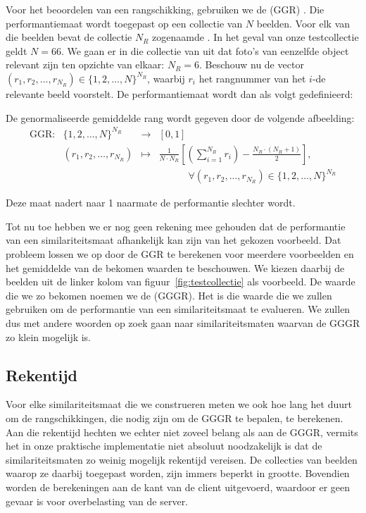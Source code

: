 Voor het beoordelen van een rangschikking, gebruiken we de  
(GGR) \cite{muller:perf_eval}. Die performantiemaat wordt toegepast op een collectie
van $N$ beelden. Voor elk van die beelden bevat de collectie
$N_R$ zogenaamde . In het geval van onze testcollectie geldt $N = 66$.
We gaan er in die collectie van uit dat foto's van eenzelfde object relevant zijn ten opzichte
van elkaar: $N_R = 6$. Beschouw nu de vector 
$(r_1,r_2,\ldots,r_{N_R}) \in \{1,2,\ldots,N\}^{N_R}$, waarbij $r_i$ het
rangnummer van het $i$-de relevante beeld voorstelt. De performantiemaat
wordt dan als volgt gedefinieerd:
\begin{definitie}
De genormaliseerde gemiddelde rang wordt gegeven door de volgende afbeelding:
\begin{displaymath}
\begin{array}{lrcl}
\textrm{GGR}: 	& \{1,2,\ldots,N\}^{N_R} & \to 	& [0,1] \\
		& (r_1,r_2,\ldots,r_{N_R}) & \mapsto &
	{\displaystyle\frac{1}{N \cdot N_R}\left[ \left(\sum_{i=1}^{N_R}r_i\right) - \frac{N_R \cdot (N_R + 1)}{2} \right]},\\[15pt]
	& & & \qquad \quad \forall (r_1, r_2, ..., r_{N_R}) \in \{1,2,\ldots,N\}^{N_R}
\end{array}
\end{displaymath}
\end{definitie}
\noindent
Deze maat nadert naar 1 naarmate de performantie slechter wordt.

Tot nu toe hebben we er nog geen rekening mee gehouden dat de performantie van
een similariteitsmaat afhankelijk kan zijn van het gekozen voorbeeld. Dat probleem lossen we
op door de GGR te berekenen voor meerdere voorbeelden en het gemiddelde van de bekomen waarden
te beschouwen. We kiezen daarbij de beelden uit de linker kolom van 
figuur~\ref{fig:testcollectie} als voorbeeld. De waarde die we zo bekomen noemen we de
 (GGGR). Het is die waarde die we zullen gebruiken
om de performantie van een similariteitsmaat te evalueren. We zullen dus met andere woorden op
zoek gaan naar similariteitsmaten waarvan de GGGR zo klein mogelijk is.

\subsection{Rekentijd}

Voor elke similariteitsmaat die we construeren meten we ook hoe lang het duurt om
de rangschikkingen, die nodig zijn om de GGGR te bepalen, te berekenen. Aan die 
rekentijd hechten we echter niet zoveel belang als aan de GGGR, vermits het in onze
praktische implementatie niet absoluut noodzakelijk is dat de similariteitsmaten zo weinig
mogelijk rekentijd vereisen. De collecties van beelden waarop ze daarbij toegepast worden,
zijn immers beperkt in grootte. Bovendien worden de berekeningen aan de kant van de client
uitgevoerd, waardoor er geen gevaar is voor overbelasting van de server.

